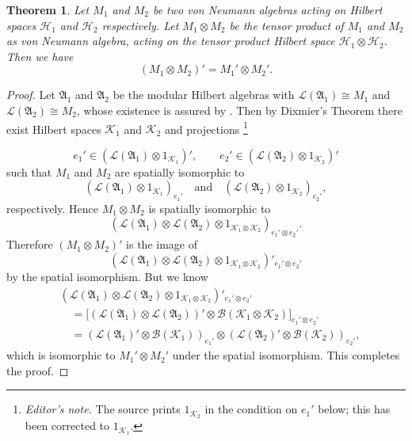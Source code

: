 \documentclass[12pt,b5paper,twoside]{article}
\theoremstyle{takesaki}
\newtheorem{theorem}{Theorem}[section]
\numberwithin{equation}{section}
\newcounter{editorialnote}
\newcommand{\ednote}[1]{%
  \stepcounter{editorialnote}%
  \begingroup
  \renewcommand{\thefootnote}{E\arabic{editorialnote}}%
  \footnote{\textit{Editor's note.} #1}%
  \addtocounter{footnote}{-1}%
  \endgroup
}
\begin{document}
\begin{theorem}\label{thm:12.3}
Let $M_1$ and $M_2$ be two von Neumann algebras acting on Hilbert
spaces $\mathcal H_1$ and $\mathcal H_2$ respectively.  Let
$M_1\otimes M_2$ be the tensor product of $M_1$ and
$M_2$ as von Neumann algebra, acting on the tensor product Hilbert
space $\mathcal H_1\otimes\mathcal H_2$.  Then we have
\[
 (M_1\otimes M_2)'
 =M_1'\otimes M_2'.
\]
\end{theorem}

\begin{proof}
Let $\mathfrak A_1$ and $\mathfrak A_2$ be the modular Hilbert
algebras with $\mathcal L(\mathfrak A_1)\cong M_1$ and
$\mathcal L(\mathfrak A_2)\cong M_2$, whose existence is assured by
.  Then by Dixmier's Theorem
\cite[Theorem~3, p.~55]{ref3} there exist Hilbert spaces
$\mathcal K_1$ and $\mathcal K_2$ and projections\ednote{The source prints
$1_{\mathcal K_2}$ in the condition on $e_1'$ below; this has been corrected
to $1_{\mathcal K_1}$.}
\[
 e_1'\in(\mathcal L(\mathfrak A_1)\otimes
 1_{\mathcal K_1})',
 \qquad
 e_2'\in(\mathcal L(\mathfrak A_2)\otimes
 1_{\mathcal K_2})'
\]
such that $M_1$ and $M_2$ are spatially isomorphic to
\[
 (\mathcal L(\mathfrak A_1)\otimes
 1_{\mathcal K_1})_{e_1'}
 \quad\text{and}\quad
 (\mathcal L(\mathfrak A_2)\otimes
 1_{\mathcal K_2})_{e_2'},
\]
respectively.  Hence $M_1\otimes M_2$ is spatially
isomorphic to
\[
 (\mathcal L(\mathfrak A_1)\otimes
  \mathcal L(\mathfrak A_2)\otimes
  1_{\mathcal K_1\otimes\mathcal K_2})_{e_1'\otimes e_2'}.
\]
Therefore $(M_1\otimes M_2)'$ is the image of
\[
 (\mathcal L(\mathfrak A_1)\otimes
  \mathcal L(\mathfrak A_2)\otimes
  1_{\mathcal K_1\otimes\mathcal K_2})'_{e_1'\otimes e_2'}
\]
by the spatial isomorphism.  But we know
\begin{align*}
 &(\mathcal L(\mathfrak A_1)\otimes
   \mathcal L(\mathfrak A_2)\otimes
   1_{\mathcal K_1\otimes\mathcal K_2})'_{e_1'\otimes e_2'}\\
 &\quad=\bigl[(\mathcal L(\mathfrak A_1)
   \otimes\mathcal L(\mathfrak A_2))'
   \otimes\mathscr B(\mathcal K_1\otimes\mathcal K_2)
   \bigr]_{e_1'\otimes e_2'}\\
 &\quad=(\mathcal L(\mathfrak A_1)'
   \otimes\mathscr B(\mathcal K_1))_{e_1'}
   \otimes
   (\mathcal L(\mathfrak A_2)'
   \otimes\mathscr B(\mathcal K_2))_{e_2'},
\end{align*}
which is isomorphic to
$M_1'\otimes M_2'$ under the spatial isomorphism.
This
completes the proof.
\end{proof}
\end{document}
